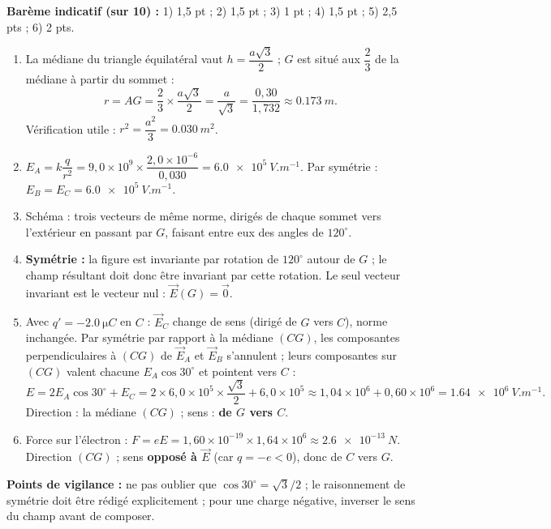 \documentclass[11pt]{article}
\begin{document}
\begin{corrige}
\textbf{Barème indicatif (sur 10) :} 1) 1,5 pt ; 2) 1,5 pt ; 3) 1 pt ; 4) 1,5 pt ; 5) 2,5 pts ; 6) 2 pts.
\begin{enumerate}
\item La médiane du triangle équilatéral vaut $h = \dfrac{a\sqrt{3}}{2}$ ; $G$ est situé aux $\dfrac{2}{3}$ de la médiane à partir du sommet :
\[ r = AG = \frac{2}{3}\times\frac{a\sqrt{3}}{2} = \frac{a}{\sqrt{3}} = \frac{0,30}{1,732} \approx \SI{0,173}{m}. \]
Vérification utile : $r^2 = \dfrac{a^2}{3} = \SI{0,030}{m^2}$.
\item $E_A = k\dfrac{q}{r^2} = 9,0\times 10^{9}\times\dfrac{2,0\times 10^{-6}}{0,030} = \SI{6,0e5}{V.m^{-1}}$.
Par symétrie : $E_B = E_C = \SI{6,0e5}{V.m^{-1}}$.
\item Schéma : trois vecteurs de même norme, dirigés de chaque sommet vers l'extérieur en passant par $G$, faisant entre eux des angles de $120^\circ$.
\item \textbf{Symétrie :} la figure est invariante par rotation de $120^\circ$ autour de $G$ ; le champ résultant doit donc être invariant par cette rotation. Le seul vecteur invariant est le vecteur nul : $\vec{E}(G) = \vec{0}$.
\item Avec $q' = -\SI{2,0}{\micro C}$ en $C$ : $\vec{E}_C$ change de sens (dirigé de $G$ vers $C$), norme inchangée. Par symétrie par rapport à la médiane $(CG)$, les composantes perpendiculaires à $(CG)$ de $\vec{E}_A$ et $\vec{E}_B$ s'annulent ; leurs composantes sur $(CG)$ valent chacune $E_A\cos 30^\circ$ et pointent vers $C$ :
\[ E = 2E_A\cos 30^\circ + E_C = 2\times 6,0\times 10^{5}\times\frac{\sqrt{3}}{2} + 6,0\times 10^{5} \approx 1,04\times 10^{6} + 0,60\times 10^{6} = \SI{1,64e6}{V.m^{-1}}. \]
Direction : la médiane $(CG)$ ; sens : \textbf{de $G$ vers $C$}.
\item Force sur l'électron : $F = eE = 1,60\times 10^{-19}\times 1,64\times 10^{6} \approx \SI{2,6e-13}{N}$.
Direction $(CG)$ ; sens \textbf{opposé à $\vec{E}$} (car $q = -e < 0$), donc de $C$ vers $G$.
\end{enumerate}
\textbf{Points de vigilance :} ne pas oublier que $\cos 30^\circ = \sqrt{3}/2$ ; le raisonnement de symétrie doit être rédigé explicitement ; pour une charge négative, inverser le sens du champ avant de composer.
\end{corrige}
\end{document}
